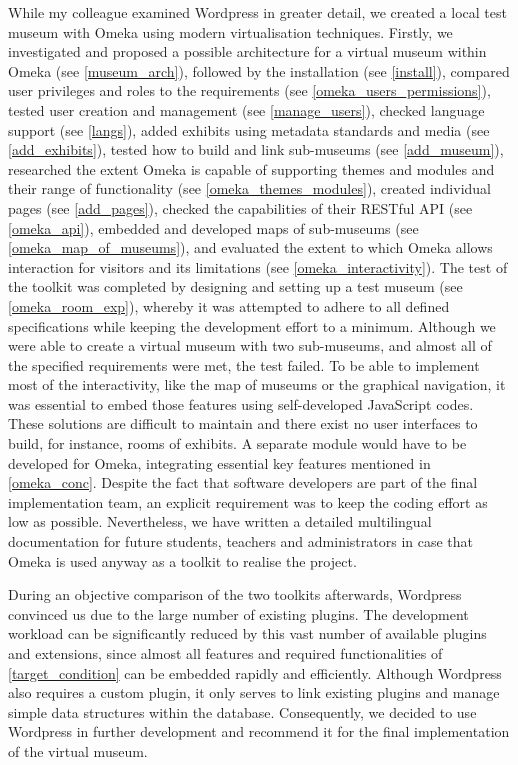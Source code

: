While my colleague examined Wordpress in greater detail, we created a local test museum with Omeka using modern virtualisation techniques. Firstly, we investigated and proposed a possible architecture for a virtual museum within Omeka (see \ref{museum_arch}), followed by the installation (see \ref{install}), compared user privileges and roles to the requirements (see \ref{omeka_users_permissions}), tested user creation and management (see \ref{manage_users}), checked language support (see \ref{langs}), added exhibits using metadata standards and media (see \ref{add_exhibits}), tested how to build and link sub-museums (see \ref{add_museum}), researched the extent Omeka is capable of supporting themes and modules and their range of functionality (see \ref{omeka_themes_modules}), created individual pages (see \ref{add_pages}), checked the capabilities of their RESTful API (see \ref{omeka_api}), embedded and developed maps of sub-museums (see \ref{omeka_map_of_museums}), and evaluated the extent to which Omeka allows interaction for visitors and its limitations (see \ref{omeka_interactivity}). The test of the toolkit was completed by designing and setting up a test museum (see \ref{omeka_room_exp}), whereby it was attempted to adhere to all defined specifications while keeping the development effort to a minimum. Although we were able to create a virtual museum with two sub-museums, and almost all of the specified requirements were met, the test failed. To be able to implement most of the interactivity, like the map of museums or the graphical navigation, it was essential to embed those features using self-developed JavaScript codes. These solutions are difficult to maintain and there exist no user interfaces to build, for instance, rooms of exhibits. A separate module would have to be developed for Omeka, integrating essential key features mentioned in \ref{omeka_conc}. Despite the fact that software developers are part of the final implementation team, an explicit requirement was to keep the coding effort as low as possible. Nevertheless, we have written a detailed multilingual documentation for future students, teachers and administrators in case that Omeka is used anyway as a toolkit to realise the project. 

During an objective comparison of the two toolkits afterwards, Wordpress convinced us due to the large number of existing plugins. The development workload can be significantly reduced by this vast number of available plugins and extensions, since almost all features and required functionalities of \ref{target_condition} can be embedded rapidly and efficiently. Although Wordpress also requires a custom plugin, it only serves to link existing plugins and manage simple data structures within the database. Consequently, we decided to use Wordpress in further development and recommend it for the final implementation of the virtual museum.


